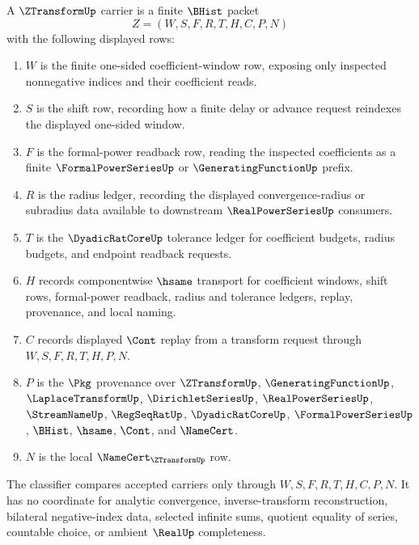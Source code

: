 \begin{definition}
\label{def:z-transform-carrier}
A $\ZTransformUp$ carrier is a finite $\BHist$ packet
$$
Z=(W,S,F,R,T,H,C,P,N)
$$
with the following displayed rows:
\begin{enumerate}
\item $W$ is the finite one-sided coefficient-window row, exposing only inspected nonnegative indices and their coefficient reads.
\item $S$ is the shift row, recording how a finite delay or advance request reindexes the displayed one-sided window.
\item $F$ is the formal-power readback row, reading the inspected coefficients as a finite $\FormalPowerSeriesUp$ or $\GeneratingFunctionUp$ prefix.
\item $R$ is the radius ledger, recording the displayed convergence-radius or subradius data available to downstream $\RealPowerSeriesUp$ consumers.
\item $T$ is the $\DyadicRatCoreUp$ tolerance ledger for coefficient budgets, radius budgets, and endpoint readback requests.
\item $H$ records componentwise $\hsame$ transport for coefficient windows, shift rows, formal-power readback, radius and tolerance ledgers, replay, provenance, and local naming.
\item $C$ records displayed $\Cont$ replay from a transform request through $W,S,F,R,T,H,P,N$.
\item $P$ is the $\Pkg$ provenance over $\ZTransformUp$, $\GeneratingFunctionUp$, $\LaplaceTransformUp$, $\DirichletSeriesUp$, $\RealPowerSeriesUp$, $\StreamNameUp$, $\RegSeqRatUp$, $\DyadicRatCoreUp$, $\FormalPowerSeriesUp$, $\BHist$, $\hsame$, $\Cont$, and $\NameCert$.
\item $N$ is the local $\NameCert_{\ZTransformUp}$ row.
\end{enumerate}
The classifier compares accepted carriers only through $W,S,F,R,T,H,C,P,N$. It has no coordinate for analytic convergence, inverse-transform reconstruction, bilateral negative-index data, selected infinite sums, quotient equality of series, countable choice, or ambient $\RealUp$ completeness.
\end{definition}


